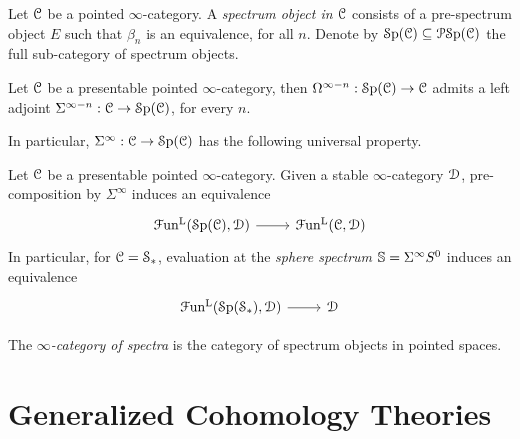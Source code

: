 \documentclass[10pt]{amsart}
\numberwithin{equation}{section}
\begin{document}
\begin{definition}
  Let $\mathcal{C}$ be a pointed $\infty$-category. A \emph{spectrum object in $\mathcal{C}$} consists of a pre-spectrum object $E$ such that $\beta_n$ is an equivalence, for all $n$. Denote by $\mathcal{S}\mathrm{p}(\mathcal{C})\subseteq\mathcal{P}\mathcal{S}\mathrm{p}(\mathcal{C})$ the full sub-category of spectrum objects. 
\end{definition}
\begin{theorem}
  Let $\mathcal{C}$ be a presentable pointed $\infty$-category, then $\Omega^{\infty-n}:\mathcal{S}\mathrm{p}(\mathcal{C})\to\mathcal{C}$ admits a left adjoint $\Sigma^{\infty-n}:\mathcal{C}\to\mathcal{S}\mathrm{p}(\mathcal{C})$, for every $n$. 
\end{theorem}
In particular, $\Sigma^\infty:\mathcal{C}\to\mathcal{S}\mathrm{p}(\mathcal{C})$ has the following universal property. 
\begin{theorem}
 Let $\mathcal{C}$ be a presentable pointed $\infty$-category. Given a stable $\infty$-category $\mathcal{D}$, pre-composition by $\Sigma^\infty$ induces an equivalence 
 \begin{equation}
  \begin{tikzcd}
    \Fun^\mL(\Sp(\lC),\lD) \arrow[r] & \Fun^\mL(\lC,\lD)
  \end{tikzcd}
 \end{equation}In particular, for $\mathcal{C}=\mathcal{S}_*$, evaluation at the \emph{sphere spectrum} $\mathbb{S}=\Sigma^\infty S^0$ induces an equivalence
 \begin{equation}
  \begin{tikzcd}
    \Fun^\mL(\Sp(\lS_*),\lD) \arrow[r] & \lD
  \end{tikzcd}
 \end{equation}
\end{theorem}
\begin{definition}
  The \emph{$\infty$-category of spectra} is the category of spectrum objects in pointed spaces. 
\end{definition}

\section{Generalized Cohomology Theories}
\end{document}
